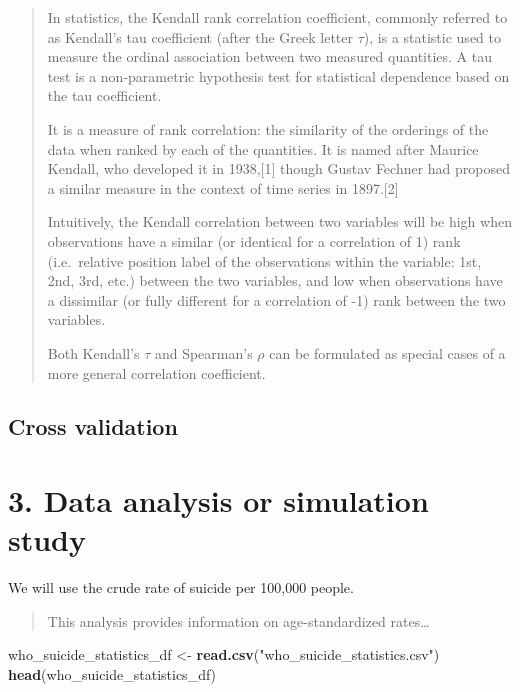 \documentclass[]{article}
\newenvironment{Shaded}{\begin{snugshade}}{\end{snugshade}}
\newcommand{\KeywordTok}[1]{\textcolor[rgb]{0.13,0.29,0.53}{\textbf{#1}}}
\newcommand{\NormalTok}[1]{#1}
\newcommand{\StringTok}[1]{\textcolor[rgb]{0.31,0.60,0.02}{#1}}
\begin{document}
\begin{quote}
In statistics, the Kendall rank correlation coefficient, commonly
referred to as Kendall's tau coefficient (after the Greek letter
\(\tau\)), is a statistic used to measure the ordinal association
between two measured quantities. A tau test is a non-parametric
hypothesis test for statistical dependence based on the tau coefficient.

It is a measure of rank correlation: the similarity of the orderings of
the data when ranked by each of the quantities. It is named after
Maurice Kendall, who developed it in 1938,{[}1{]} though Gustav Fechner
had proposed a similar measure in the context of time series in
1897.{[}2{]}

Intuitively, the Kendall correlation between two variables will be high
when observations have a similar (or identical for a correlation of 1)
rank (i.e.~relative position label of the observations within the
variable: 1st, 2nd, 3rd, etc.) between the two variables, and low when
observations have a dissimilar (or fully different for a correlation of
-1) rank between the two variables.

Both Kendall's \(\tau\) and Spearman's \(\rho\) can be formulated as
special cases of a more general correlation coefficient.
\end{quote}

\hypertarget{cross-validation}{%
\subsection{Cross validation}\label{cross-validation}}

\hypertarget{data-analysis-or-simulation-study}{%
\section{3. Data analysis or simulation
study}\label{data-analysis-or-simulation-study}}

We will use the crude rate of suicide per 100,000 people.

\begin{quote}
This analysis provides information on age-standardized rates\ldots{}
\end{quote}

\begin{Shaded}
\begin{Highlighting}[]
\NormalTok{who_suicide_statistics_df <-}\StringTok{ }\KeywordTok{read.csv}\NormalTok{(}\StringTok{"who_suicide_statistics.csv"}\NormalTok{)}
\KeywordTok{head}\NormalTok{(who_suicide_statistics_df)}
\end{Highlighting}
\end{Shaded}
\end{document}
